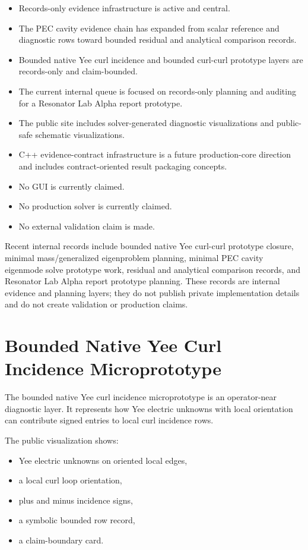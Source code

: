 \documentclass[11pt,a4paper]{article}
\begin{document}
\begin{itemize}
  \item Records-only evidence infrastructure is active and central.
  \item The PEC cavity evidence chain has expanded from scalar reference and diagnostic rows toward bounded residual and analytical comparison records.
  \item Bounded native Yee curl incidence and bounded curl-curl prototype layers are records-only and claim-bounded.
  \item The current internal queue is focused on records-only planning and auditing for a Resonator Lab Alpha report prototype.
  \item The public site includes solver-generated diagnostic visualizations and public-safe schematic visualizations.
  \item C++ evidence-contract infrastructure is a future production-core direction and includes contract-oriented result packaging concepts.
  \item No GUI is currently claimed.
  \item No production solver is currently claimed.
  \item No external validation claim is made.
\end{itemize}

Recent internal records include bounded native Yee curl-curl prototype closure, minimal mass/generalized eigenproblem planning, minimal PEC cavity eigenmode solve prototype work, residual and analytical comparison records, and Resonator Lab Alpha report prototype planning. These records are internal evidence and planning layers; they do not publish private implementation details and do not create validation or production claims.

\section{Bounded Native Yee Curl Incidence Microprototype}

The bounded native Yee curl incidence microprototype is an operator-near diagnostic layer. It represents how Yee electric unknowns with local orientation can contribute signed entries to local curl incidence rows.

The public visualization shows:

\begin{itemize}
  \item Yee electric unknowns on oriented local edges,
  \item a local curl loop orientation,
  \item plus and minus incidence signs,
  \item a symbolic bounded row record,
  \item a claim-boundary card.
\end{itemize}
\end{document}
